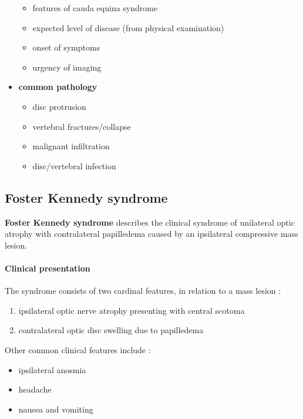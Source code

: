 \begin{itemize}
	\begin{itemize}
		\tightlist
		\item
		features of cauda equina syndrome
		\item
		expected level of disease (from physical examination)
		\item
		onset of symptoms
		\item
		urgency of imaging
	\end{itemize}
	\item
	\textbf{common pathology}
	
	\begin{itemize}
		\tightlist
		\item
		disc protrusion
		\item
		vertebral fractures/collapse
		\item
		malignant infiltration
		\item
		disc/vertebral infection
	\end{itemize}
\end{itemize}
\subsection{Foster Kennedy syndrome}

\textbf{Foster Kennedy syndrome} describes the clinical syndrome of unilateral optic atrophy with contralateral papilledema caused by an ipsilateral compressive mass lesion.

\paragraph{Clinical presentation}

The syndrome consists of two cardinal features, in relation to a mass lesion :

\begin{enumerate}
	\item
	ipsilateral optic nerve atrophy presenting with central scotoma
	\item
	contralateral optic disc swelling due to papilledema
\end{enumerate}

Other common clinical features include :

\begin{itemize}
	\item
	ipsilateral anosmia
	\item
	headache
	\item
	nausea and vomiting
\end{itemize}

